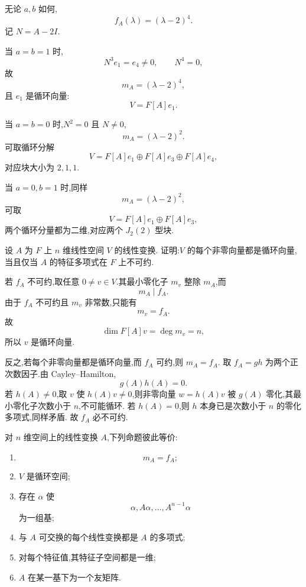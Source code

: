 \begin{solution}
无论 $a,b$ 如何,
\[
\boxed{f_A(\lambda)=(\lambda-2)^4}.
\]
记 $N=A-2I$.

当 $a=b=1$ 时,
\[
N^3e_1=e_4\neq0,\qquad N^4=0,
\]
故
\[
m_A=(\lambda-2)^4,
\]
且 $e_1$ 是循环向量:
\[
V=F[A]e_1.
\]

当 $a=b=0$ 时,$N^2=0$ 且 $N\neq0$,
\[
m_A=(\lambda-2)^2.
\]
可取循环分解
\[
V
=
F[A]e_1\oplus F[A]e_3\oplus F[A]e_4,
\]
对应块大小为 $2,1,1$.

当 $a=0,b=1$ 时,同样
\[
m_A=(\lambda-2)^2,
\]
可取
\[
\boxed{
V=F[A]e_1\oplus F[A]e_3,
}
\]
两个循环分量都为二维,对应两个 $J_2(2)$ 型块.
\end{solution}


\begin{example}
设 $A$ 为 $F$ 上 $n$ 维线性空间 $V$ 的线性变换.
证明:$V$ 的每个非零向量都是循环向量,当且仅当
$A$ 的特征多项式在 $F$ 上不可约.
\end{example}
\exampleblank

\begin{solution}
若 $f_A$ 不可约,取任意 $0\neq v\in V$.其最小零化子 $m_v$ 整除
$m_A$,而
\[
m_A\mid f_A.
\]
由于 $f_A$ 不可约且 $m_v$ 非常数,只能有
\[
m_v=f_A.
\]
故
\[
\dim F[A]v=\deg m_v=n,
\]
所以 $v$ 是循环向量.

反之,若每个非零向量都是循环向量,而 $f_A$ 可约,则 $m_A=f_A$.
取 $f_A=gh$ 为两个正次数因子.由 Cayley--Hamilton,
\[
g(A)h(A)=0.
\]
若 $h(A)\neq0$,取 $v$ 使 $h(A)v\neq0$,则非零向量
$w=h(A)v$ 被 $g(A)$ 零化,其最小零化子次数小于 $n$,不可能循环.
若 $h(A)=0$,则 $h$ 本身已是次数小于 $n$ 的零化多项式,同样矛盾.
故 $f_A$ 必不可约.
\end{solution}


\begin{proposition}[\markstar]
对 $n$ 维空间上的线性变换 $A$,下列命题彼此等价:
\begin{enumerate}
    \item
    \[
    m_A=f_A;
    \]
    \item $V$ 是循环空间;
    \item 存在 $\alpha$ 使
    \[
    \alpha,A\alpha,\ldots,A^{n-1}\alpha
    \]
    为一组基;
    \item 与 $A$ 可交换的每个线性变换都是 $A$ 的多项式;
    \item 对每个特征值,其特征子空间都是一维;
    \item $A$ 在某一基下为一个友矩阵.
\end{enumerate}
\end{proposition}


